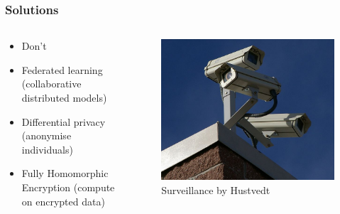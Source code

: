 \documentclass[aspectratio=169]{beamer}
\begin{document}
  \begin{frame}
    \frametitle{Solutions}
    \begin{columns}
      \begin{column}{0.5\textwidth}
        \begin{itemize}
          \item Don't
          \item Federated learning (collaborative distributed models)
          \item Differential privacy (anonymise individuals)
          \item Fully Homomorphic Encryption (compute on encrypted data)
        \end{itemize}
      \end{column}
      \begin{column}{0.5\textwidth}
        \begin{figure}[th!]
          \centering
          \includegraphics[width=1\textwidth]{surveillance.jpg}
          \caption{Surveillance by Hustvedt \autocite{cc}}
          \label{fig:jim_carrey}
        \end{figure}
      \end{column}
    \end{columns}
  \end{frame}
\end{document}
